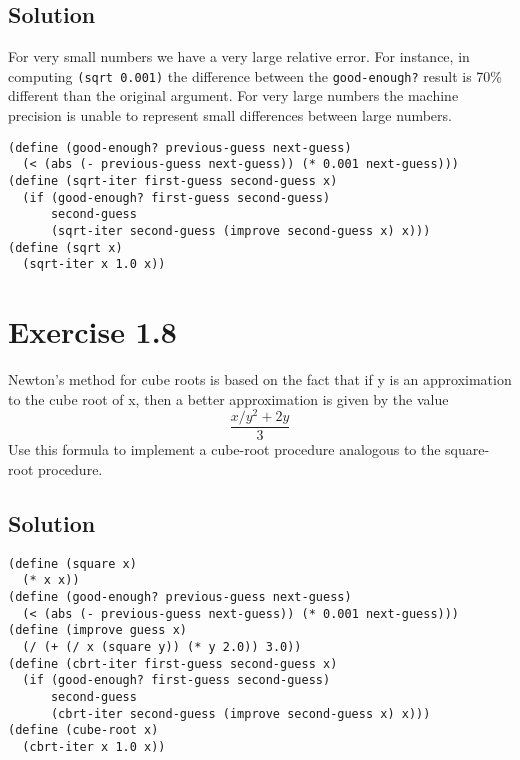 \documentclass[11pt]{article}
\begin{document}
\subsection{Solution}
\label{sec:org03880b8}
For very small numbers we have a very large relative error. For
instance, in computing \texttt{(sqrt 0.001)} the difference between the
\texttt{good-enough?} result is 70\% different than the original argument.
For very large numbers the machine precision is unable to represent
small differences between large numbers.
\begin{verbatim}
(define (good-enough? previous-guess next-guess)
  (< (abs (- previous-guess next-guess)) (* 0.001 next-guess)))
(define (sqrt-iter first-guess second-guess x)
  (if (good-enough? first-guess second-guess)
      second-guess
      (sqrt-iter second-guess (improve second-guess x) x)))
(define (sqrt x)
  (sqrt-iter x 1.0 x))
\end{verbatim}

\section{Exercise 1.8}
\label{sec:org8abd7c3}
Newton's method for cube roots is based on the fact that if y is an
approximation to the cube root of x, then a better approximation is
given by the value
\begin{equation}
\frac{x/y^2+2y}{3}
\end{equation}
Use this formula to implement a cube-root procedure analogous to the
square-root procedure.
\subsection{Solution}
\label{sec:orgb838b3f}
\begin{verbatim}
(define (square x)
  (* x x))
(define (good-enough? previous-guess next-guess)
  (< (abs (- previous-guess next-guess)) (* 0.001 next-guess)))
(define (improve guess x)
  (/ (+ (/ x (square y)) (* y 2.0)) 3.0))
(define (cbrt-iter first-guess second-guess x)
  (if (good-enough? first-guess second-guess)
      second-guess
      (cbrt-iter second-guess (improve second-guess x) x)))
(define (cube-root x)
  (cbrt-iter x 1.0 x))
\end{verbatim}
\end{document}
